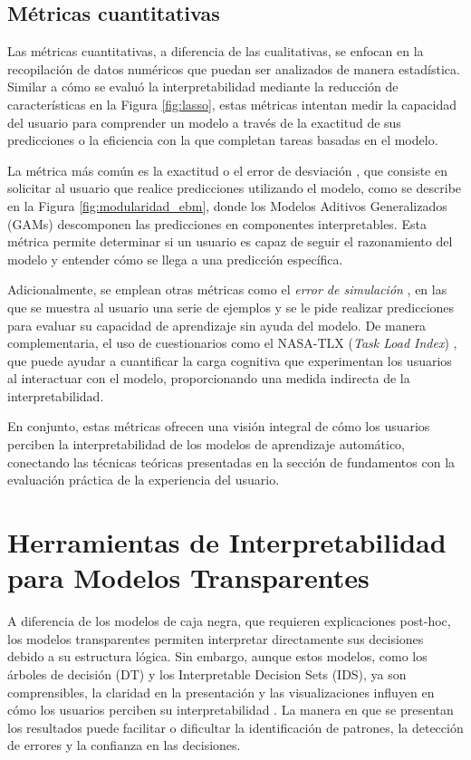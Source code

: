 \subsection{Métricas cuantitativas}

Las métricas cuantitativas, a diferencia de las cualitativas, se enfocan en la recopilación de datos numéricos que puedan ser analizados de manera estadística. Similar a cómo se evaluó la interpretabilidad mediante la reducción de características en la Figura \ref{fig:lasso}, estas métricas intentan medir la capacidad del usuario para comprender un modelo a través de la exactitud de sus predicciones o la eficiencia con la que completan tareas basadas en el modelo.

La métrica más común es la exactitud o el error de desviación \cite{lakkaraju-2016, Poursabzi-2021}, que consiste en solicitar al usuario que realice predicciones utilizando el modelo, como se describe en la Figura \ref{fig:modularidad_ebm}, donde los Modelos Aditivos Generalizados (GAMs) descomponen las predicciones en componentes interpretables. Esta métrica permite determinar si un usuario es capaz de seguir el razonamiento del modelo y entender cómo se llega a una predicción específica.

Adicionalmente, se emplean otras métricas como el \textit{error de simulación} \cite{Poursabzi-2021}, en las que se muestra al usuario una serie de ejemplos y se le pide realizar predicciones para evaluar su capacidad de aprendizaje sin ayuda del modelo. De manera complementaria, el uso de cuestionarios como el NASA-TLX (\emph{Task Load Index}) \cite{Hart-1988}, que puede ayudar a cuantificar la carga cognitiva que experimentan los usuarios al interactuar con el modelo, proporcionando una medida indirecta de la interpretabilidad.

En conjunto, estas métricas ofrecen una visión integral de cómo los usuarios perciben la interpretabilidad de los modelos de aprendizaje automático, conectando las técnicas teóricas presentadas en la sección de fundamentos con la evaluación práctica de la experiencia del usuario.

\section{Herramientas de Interpretabilidad para Modelos Transparentes}

A diferencia de los modelos de caja negra, que requieren explicaciones post-hoc, los modelos transparentes permiten interpretar directamente sus decisiones debido a su estructura lógica. Sin embargo, aunque estos modelos, como los árboles de decisión (DT) y los Interpretable Decision Sets (IDS), ya son comprensibles, la claridad en la presentación y las visualizaciones influyen en cómo los usuarios perciben su interpretabilidad \cite{curso-xai, Rudin-2019}. La manera en que se presentan los resultados puede facilitar o dificultar la identificación de patrones, la detección de errores y la confianza en las decisiones.

